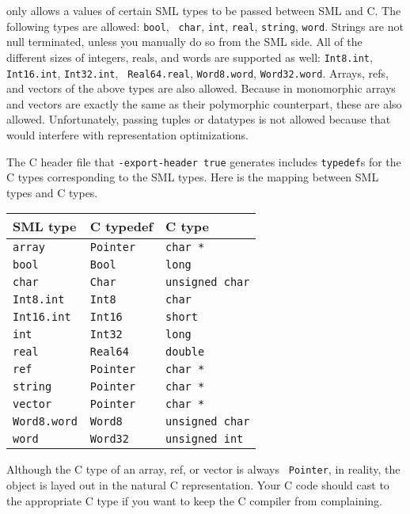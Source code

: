 {\mlton} only allows a values of certain SML types to be passed
between SML and C.  The following types are allowed: {\tt bool}, {\tt
char}, {\tt int}, {\tt real}, {\tt string}, {\tt word}.  Strings are
not null terminated, unless you manually do so from the SML side.  All
of the different sizes of integers, reals, and words are supported as
well: {\tt Int8.int}, {\tt Int16.int}, {\tt Int32.int}, {\tt
Real64.real}, {\tt Word8.word}, {\tt Word32.word}.  Arrays, refs, and
vectors of the above types are also allowed.  Because in {\mlton}
monomorphic arrays and vectors are exactly the same as their
polymorphic counterpart, these are also allowed.  Unfortunately,
passing tuples or datatypes is not allowed because that would
interfere with representation optimizations.

The C header file that {\tt -export-header true} generates includes
{\tt typedef}s for the C types corresponding to the SML types.  Here
is the mapping between SML types and C types.

\begin{center}
\begin{tabular}{lll}
SML type & C typedef & C type\\
\hline
{\tt array} & {\tt Pointer} & {\tt char *} \\
{\tt bool} & {\tt Bool} & {\tt long} \\
{\tt char} & {\tt Char} & {\tt unsigned char} \\
{\tt Int8.int} & {\tt Int8} & {\tt char} \\
{\tt Int16.int} & {\tt Int16} & {\tt short} \\
{\tt int} & {\tt Int32} & {\tt long} \\
{\tt real} & {\tt Real64} & {\tt double} \\
{\tt ref} & {\tt Pointer} & {\tt char *} \\
{\tt string} & {\tt Pointer} & {\tt char *} \\
{\tt vector} & {\tt Pointer} & {\tt char *} \\
{\tt Word8.word} & {\tt Word8} & {\tt unsigned char} \\
{\tt word} & {\tt Word32} & {\tt unsigned int} \\
\end{tabular}
\end{center}

Although the C type of an array, ref, or vector is always {\tt
Pointer}, in reality, the object is layed out in the natural C
representation.  Your C code should cast to the appropriate C type if
you want to keep the C compiler from complaining.

